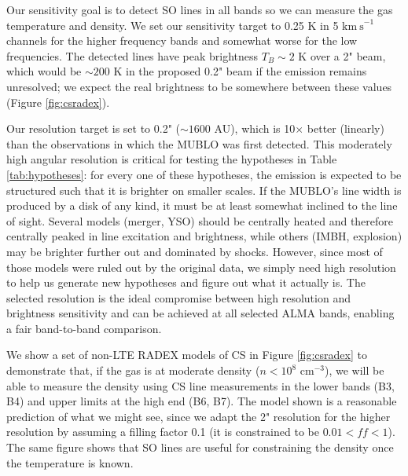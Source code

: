 \documentclass[12pt,a4paper]{article}  %
\newcommand{\kms}{\ensuremath{\mathrm{km~s}^{-1}}\xspace}
\newcommand{\percc}{\ensuremath{\mathrm{cm}^{-3}}\xspace}
\newcommand{\persc}{\ensuremath{\mathrm{cm}^{-2}}\xspace}
\begin{document}
Our sensitivity goal is to detect SO lines in all bands so we can measure the gas temperature and density.
We set our sensitivity target to 0.25 K in 5 \kms channels for the higher frequency bands and somewhat worse for the low frequencies.
The detected lines have peak brightness $T_B\sim2$ K over a 2" beam, which would be $\sim200$ K in the proposed 0.2" beam if the emission remains unresolved; we expect the real brightness to be somewhere between these values (Figure \ref{fig:csradex}).

Our resolution target is set to 0.2" ($\sim1600$ AU), which is 10$\times$ better (linearly) than the observations in which the MUBLO was first detected.
This moderately high angular resolution is critical for testing the hypotheses in Table \ref{tab:hypotheses}:
for every one of these hypotheses, the emission is expected to be structured such that it is brighter on smaller scales.
If the MUBLO's line width is produced by a disk of any kind, it must be at least somewhat inclined to the line of sight.
Several models (merger, YSO) should be centrally heated and therefore centrally peaked in line excitation and brightness, while others (IMBH, explosion) may be brighter further out and dominated by shocks.
However, since most of those models were ruled out by the original data, we simply need high resolution to help us generate new hypotheses and figure out what it actually is.
The selected resolution is the ideal compromise between high resolution and brightness sensitivity and can be achieved at all selected ALMA bands, enabling a fair band-to-band comparison.

We show a set of non-LTE RADEX models of CS in Figure \ref{fig:csradex} to demonstrate that, if the gas is at moderate density ($n<10^8$ \percc), we will be able to measure the density using CS line measurements in the lower bands (B3, B4) and upper limits at the high end (B6, B7).
The model shown is a reasonable prediction of what we might see, since we adapt the 2" resolution for the higher resolution by assuming a filling factor 0.1 (it is constrained to be $0.01<ff<1$).
The same figure shows that SO lines are useful for constraining the density once the temperature is known.



\end{document}
